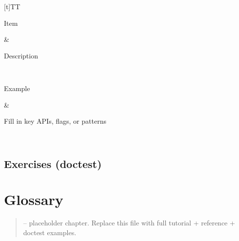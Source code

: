 \documentclass[a4paper,11pt,english]{sphinxmanual}
\begin{document}
\begin{savenotes}\sphinxattablestart
\sphinxthistablewithglobalstyle
\centering
\begin{tabulary}{\linewidth}[t]{TT}
\sphinxtoprule
\begin{varwidth}[t]{}
\sphinxstyletheadfamily \sphinxAtStartPar
Item
\sphinxbeforeendvarwidth
\end{varwidth}%
&\begin{varwidth}[t]{}
\sphinxstyletheadfamily \sphinxAtStartPar
Description
\sphinxbeforeendvarwidth
\end{varwidth}%
\\
\sphinxmidrule
\sphinxtableatstartofbodyhook\begin{varwidth}[t]{}
\sphinxAtStartPar
Example
\sphinxbeforeendvarwidth
\end{varwidth}%
&\begin{varwidth}[t]{}
\sphinxAtStartPar
Fill in key APIs, flags, or patterns
\sphinxbeforeendvarwidth
\end{varwidth}%
\\
\sphinxbottomrule
\end{tabulary}
\sphinxtableafterendhook\par
\sphinxattableend\end{savenotes}


\subsection{Exercises (doctest)}
\label{\detokenize{appendices/further_reading:exercises-doctest}}
\begin{sphinxVerbatim}[commandchars=\\\{\}]
\end{sphinxVerbatim}

\sphinxstepscope


\section{Glossary}
\label{\detokenize{appendices/glossary:glossary}}\label{\detokenize{appendices/glossary::doc}}\begin{quote}

\sphinxAtStartPar
{} – placeholder chapter. Replace this file with full tutorial + reference + doctest examples.
\end{quote}
\end{document}
